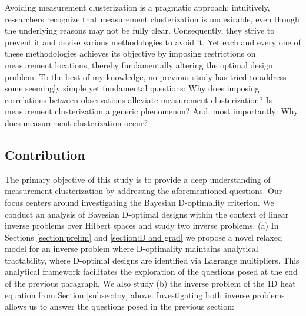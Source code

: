 Avoiding measurement clusterization is a pragmatic approach:
intuitively, researchers recognize that measurement clusterization is
undesirable, even though the underlying reasons may not be fully
clear. Consequently, they strive to prevent it and devise various
methodologies to avoid it. Yet each and every one of these
methodologies achieves its objective by imposing restrictions on
measurement locations, thereby fundamentally altering the optimal
design problem. To the best of my knowledge, no previous study has
tried to address some seemingly simple yet fundamental questions:
%
Why does imposing correlations between observations alleviate
measurement clusterization?
%
Is measurement clusterization a generic phenomenon? 
%
And, most importantly: Why does measurement clusterization occur?
%
%


\subsection{Contribution}
The primary objective of this study is to provide a deep understanding
of measurement clusterization by addressing the aforementioned
questions. Our focus centers around investigating the Bayesian
D-optimality criterion. We conduct an analysis of Bayesian D-optimal
designs within the context of linear inverse problems over Hilbert
spaces and study two inverse problems: (a) In Sections
\ref{section:prelim} and \ref{section:D and grad} we propose a novel
relaxed model for an inverse problem where D-optimality maintains
analytical tractability, where D-optimal designs are identified via
Lagrange multipliers. This analytical framework facilitates the
exploration of the questions posed at the end of the previous
paragraph. We also study (b) the inverse problem of the 1D heat
equation from Section \ref{subsec:toy} above. Investigating both
inverse problems allows us to answer the questions posed in the
previous section:

